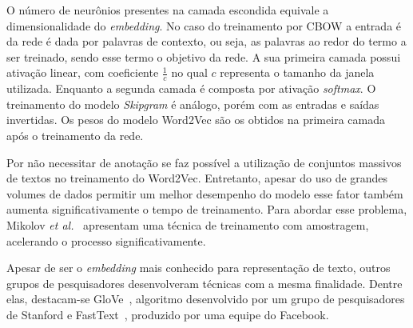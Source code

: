O número de neurônios presentes na camada escondida equivale a dimensionalidade do \textit{embedding}.
No caso do treinamento por CBOW a entrada é da rede é dada por palavras de contexto, ou seja, as palavras ao redor do
termo a ser treinado, sendo esse termo o objetivo da rede.
A sua primeira camada possui ativação linear, com coeficiente $\frac{1}{c}$ no qual $c$ representa o tamanho da janela
utilizada.
Enquanto a segunda camada é composta por ativação \textit{softmax}.
O treinamento do modelo \textit{Skipgram} é análogo, porém com as entradas e saídas invertidas.
Os pesos do modelo Word2Vec são os obtidos na primeira camada após o treinamento da rede.

Por não necessitar de anotação se faz possível a utilização de conjuntos massivos de textos no treinamento do Word2Vec.
Entretanto, apesar do uso de grandes volumes de dados permitir um melhor desempenho do modelo esse fator também aumenta
significativamente o tempo de treinamento.
Para abordar esse problema, Mikolov \textit{et al.}~\cite{mikolov13b} apresentam uma técnica de treinamento com
amostragem, acelerando o processo significativamente.

Apesar de ser o \textit{embedding} mais conhecido para representação de texto, outros grupos de pesquisadores
desenvolveram técnicas com a mesma finalidade.
Dentre elas, destacam-se GloVe~\cite{pennington14}, algoritmo desenvolvido por um grupo de pesquisadores de Stanford e
FastText~\cite{bojanowski16}, produzido por uma equipe do Facebook.
